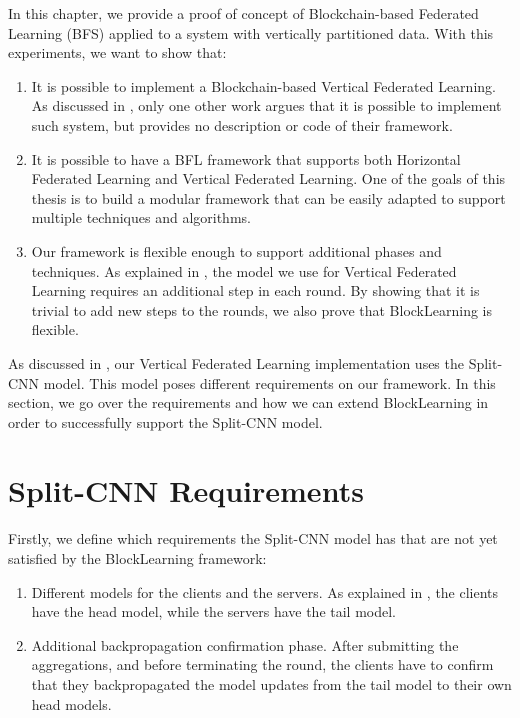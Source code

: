 In this chapter, we provide a proof of concept of Blockchain-based Federated Learning (BFS) applied to a system with vertically partitioned data. With this experiments, we want to show that:

\begin{enumerate}
    \item It is possible to implement a Blockchain-based Vertical Federated Learning. As discussed in , only one other work argues that it is possible to implement such system, but provides no description or code of their framework.

    \item It is possible to have a BFL framework that supports both Horizontal Federated Learning and Vertical Federated Learning. One of the goals of this thesis is to build a modular framework that can be easily adapted to support multiple techniques and algorithms.
    
    \item Our framework is flexible enough to support additional phases and techniques. As explained in , the model we use for Vertical Federated Learning requires an additional step in each round. By showing that it is trivial to add new steps to the rounds, we also prove that BlockLearning is flexible.
\end{enumerate}

As discussed in , our Vertical Federated Learning implementation uses the Split-CNN model. This model poses different requirements on our framework. In this section, we go over the requirements and how we can extend BlockLearning in order to successfully support the Split-CNN model.

\section{Split-CNN Requirements}

Firstly, we define which requirements the Split-CNN model has that are not yet satisfied by the BlockLearning framework:

\begin{enumerate}
    \item Different models for the clients and the servers. As explained in , the clients have the head model, while the servers have the tail model.
    
    \item Additional backpropagation confirmation phase. After submitting the aggregations, and before terminating the round, the clients have to confirm that they backpropagated the model updates from the tail model to their own head models.
\end{enumerate}

